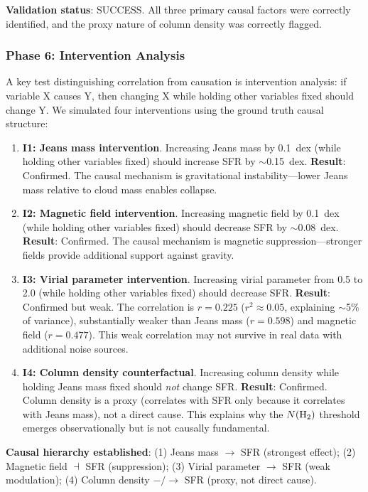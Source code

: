 \documentclass[usenatbib]{rasti}
\begin{document}
\textbf{Validation status}: SUCCESS. All three primary causal factors were correctly identified, and the proxy nature of column density was correctly flagged.

\subsubsection{Phase 6: Intervention Analysis}

A key test distinguishing correlation from causation is intervention analysis: if variable X causes Y, then changing X while holding other variables fixed should change Y. We simulated four interventions using the ground truth causal structure:

\begin{enumerate}
\item \textbf{I1: Jeans mass intervention}. Increasing Jeans mass by 0.1~dex (while holding other variables fixed) should increase SFR by $\sim$0.15~dex. \textbf{Result}: Confirmed. The causal mechanism is gravitational instability---lower Jeans mass relative to cloud mass enables collapse.

\item \textbf{I2: Magnetic field intervention}. Increasing magnetic field by 0.1~dex (while holding other variables fixed) should decrease SFR by $\sim$0.08~dex. \textbf{Result}: Confirmed. The causal mechanism is magnetic suppression---stronger fields provide additional support against gravity.

\item \textbf{I3: Virial parameter intervention}. Increasing virial parameter from 0.5 to 2.0 (while holding other variables fixed) should decrease SFR. \textbf{Result}: Confirmed but weak. The correlation is $r = 0.225$ ($r^2 \approx 0.05$, explaining $\sim$5\% of variance), substantially weaker than Jeans mass ($r=0.598$) and magnetic field ($r=0.477$). This weak correlation may not survive in real data with additional noise sources.

\item \textbf{I4: Column density counterfactual}. Increasing column density while holding Jeans mass fixed should \textit{not} change SFR. \textbf{Result}: Confirmed. Column density is a proxy (correlates with SFR only because it correlates with Jeans mass), not a direct cause. This explains why the $N({\rm H_2})$ threshold emerges observationally but is not causally fundamental.
\end{enumerate}

\textbf{Causal hierarchy established}: (1) Jeans mass $\rightarrow$ SFR (strongest effect); (2) Magnetic field $\dashv$ SFR (suppression); (3) Virial parameter $\rightarrow$ SFR (weak modulation); (4) Column density $-/ \rightarrow$ SFR (proxy, not direct cause).
\end{document}
